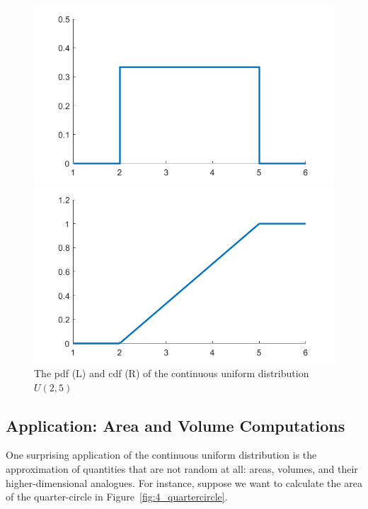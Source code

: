 \begin{figure}[htbp]
 \begin{minipage}{.5\textwidth}
        \centering
	\includegraphics[width=0.9\linewidth]{fig/2_uni_pdf}
    \end{minipage}
    \begin{minipage}{0.5\textwidth}
        \centering
	\includegraphics[width=0.9\linewidth]{fig/2_uni_cdf}
    \end{minipage}	
    \caption{The pdf (L) and cdf (R) of the continuous uniform distribution $U(2,5)$\label{fig:2_uni_pdf}}
\end{figure}

\subsection{Application: Area and Volume Computations}\label{sec2:areavolume}

One surprising application of the continuous uniform distribution is the approximation of quantities that are not random at all: areas, volumes, and their higher-dimensional analogues.
For instance, suppose we want to calculate the area of the quarter-circle in Figure~\ref{fig:4_quartercircle}.

